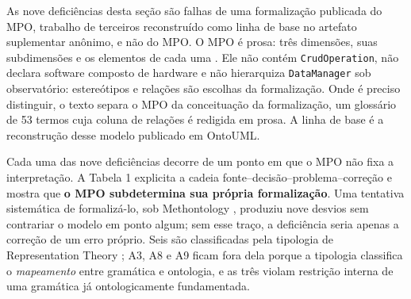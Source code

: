 As nove deficiências desta seção são falhas de uma formalização publicada do MPO, trabalho de terceiros reconstruído como linha de base no artefato suplementar anônimo, e não do MPO. O MPO é prosa: três dimensões, suas subdimensões e os elementos de cada uma \cite{vieira2021model,farias2025conceptual}. Ele não contém \texttt{CrudOperation}, não declara software composto de hardware e não hierarquiza \texttt{DataManager} sob observatório: estereótipos e relações são escolhas da formalização. Onde é preciso distinguir, o texto separa o MPO da conceituação da formalização, um glossário de 53 termos cuja coluna de relações é redigida em prosa. A linha de base é a reconstrução desse modelo publicado em OntoUML.

Cada uma das nove deficiências decorre de um ponto em que o MPO não fixa a interpretação. A Tabela 1 explicita a cadeia fonte--decisão--problema--correção e mostra que \textbf{o MPO subdetermina sua própria formalização}. Uma tentativa sistemática de formalizá-lo, sob Methontology \cite{fernandez1997methontology}, produziu nove desvios sem contrariar o modelo em ponto algum; sem esse traço, a deficiência seria apenas a correção de um erro próprio. Seis são classificadas pela tipologia de Representation Theory \cite{wand1993ontological,recker2011ontological}; A3, A8 e A9 ficam fora dela porque a tipologia classifica o \textit{mapeamento} entre gramática e ontologia, e as três violam restrição interna de uma gramática já ontologicamente fundamentada.

